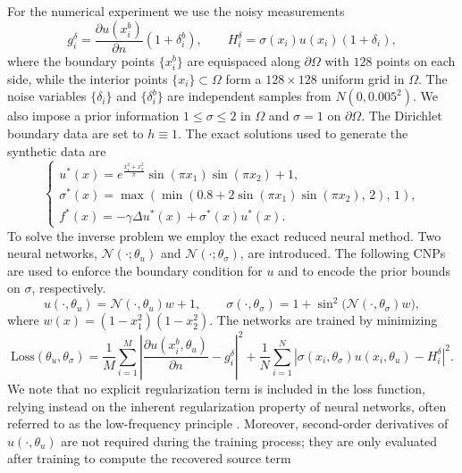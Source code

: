 \documentclass{article}
\numberwithin{equation}{section}
\begin{document}
For the numerical experiment we use the noisy measurements
\[
g_i^\delta
=
\frac{\partial u(x_i^b)}{\partial n}(1+\delta_i^b),
\qquad
H_i^\delta
=
\sigma(x_i)u(x_i)(1+\delta_i),
\]
where the boundary points $\{x_i^b\}$ are equispaced along $\partial\Omega$ with $128$ points on each side, while the interior  points $\{x_i\}\subset\Omega$ form a $128\times128$ uniform grid in $\Omega$. The noise variables $\{\delta_i\}$ and $\{\delta_i^b\}$ are independent samples from $N(0,0.005^2)$. We also impose a prior information $1\le\sigma\le2$ in $\Omega$ and $\sigma=1$ on $\partial\Omega$. The Dirichlet boundary data are set to $h\equiv1$. The exact solutions used to generate the synthetic data are
\begin{equation}
    \begin{cases}
        u^*(x)=e^{\frac{x_1^2+x_2^2}{\pi}} \sin(\pi x_1)\sin(\pi x_2)+1,\\
        \sigma^*(x)=\max\!\left(\min\!\left(0.8 + 2\sin(\pi x_1)\sin(\pi x_2),\,2\right),\,1\right),\\
        f^*(x)=-\gamma \Delta u^*(x)+\sigma^*(x) u^*(x).
    \end{cases}
\end{equation}
To solve the inverse problem we employ the exact reduced neural method. Two neural networks, $\mathcal N(\cdot;\theta_u)$ and $\mathcal N(\cdot;\theta_\sigma)$, are introduced. The following CNPs are used to enforce the boundary condition for $u$ and to encode the prior bounds on $\sigma$, respectively.
\begin{equation}
    u(\cdot,\theta_u)=\mathcal N(\cdot,\theta_u)w+1,
\qquad
\sigma(\cdot,\theta_\sigma)
=
1+\sin^2\!\big(\mathcal N(\cdot,\theta_\sigma)w\big),
\end{equation}
where \(w(x)=(1-x_1^2)(1-x_2^2)\). The networks are trained by minimizing
\begin{equation}
\text{Loss}(\theta_u,\theta_\sigma)
=
\frac1M\sum_{i=1}^M
\left|
\frac{\partial u(x_i^b,\theta_u)}{\partial n}-g_i^\delta
\right|^2
+
\frac1N\sum_{i=1}^N
\left|
\sigma(x_i,\theta_\sigma)u(x_i,\theta_u)-H_i^\delta
\right|^2 .
\end{equation}
We note that no explicit regularization term is included in the loss function, relying instead on the inherent regularization property of neural networks, often referred to as the low-frequency principle \cite{xu2025overview}. Moreover, second-order derivatives of $u(\cdot,\theta_u)$ are not required during the training process; they are only evaluated after training to compute the recovered source term
\end{document}
